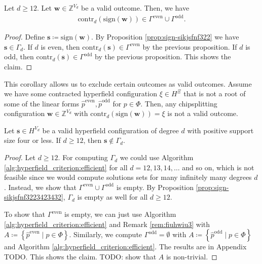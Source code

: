 \begin{corollary}\label{cor:validwunfwufneuiw}
    Let \( d \geq 12 \). Let \( \mathbf{w} \in \mathbb{Z}^{V_d} \) be a valid outcome. Then, we have 
    \begin{align*}
        \mathrm{contr}_d(\mathrm{sign}(\mathbf{w})) \in \Gamma^{\mathrm{even}} \cup \Gamma^{\mathrm{odd}}.
    \end{align*}
\end{corollary}

\begin{proof}
    Define \( \mathbf{s} \coloneqq \mathrm{sign}(\mathbf{w}) \). By Proposition \ref{prop:sign-sikjsfnf322} we have \( \mathbf{s} \in \Gamma_d \). If \( d \) is even, then \( \mathrm{contr}_d(\mathbf{s}) \in \Gamma^{\mathrm{even}} \) by the previous proposition. If \( d \) is odd, then \( \mathrm{contr}_d(\mathbf{s}) \in \Gamma^{\mathrm{odd}} \) by the previous proposition. This shows the claim.
\end{proof}

This corollary allows us to exclude certain outcomes as valid outcomes. Assume we have some contracted hyperfield configuration \( \xi \in H^{\Xi} \) that is not a root of some of the linear forms \( \hat p^{\mathrm{even}}, \hat p^{\mathrm{odd}} \) for \( p \in \Phi \). Then, any chipsplitting configuration \( \mathbf{w} \in \mathbb{Z}^{V_d} \) with \( \mathrm{contr}_d( \mathrm{sign}(\mathbf{w})) = \xi \) is not a valid outcome.


\begin{proposition}
    Let \( \mathbf{s} \in H^{V_d} \) be a valid hyperfield configuration of degree \( d \) with positive support size four or less. If \( d\geq 12 \), then \( \mathbf{s} \notin \Gamma_d \).

\end{proposition}

\begin{proof}
    Let \( d \geq 12 \). For computing \( \Gamma_d \) we could use Algorithm \ref{alg:hyperfield_criterion:efficient} for all \( d = 12, 13, 14, \dots \) and so on, which is not feasible since we would compute solutions sets for many infinitely many degrees \( d \). Instead, we show that \( \Gamma^{\mathrm{even}} \cup \Gamma^{\mathrm{odd}} \) is empty. By Proposition \ref{prop:sign-sikjsfnf3223423432}, \( \Gamma_d \) is empty as well for all \( d\geq 12 \).

    To show that \(  \Gamma^{\mathrm{even}} \) is empty, we can just use Algorithm \ref{alg:hyperfield_criterion:efficient} and Remark \ref{rem:fiuhwiu3} with \(A \coloneqq \left\{ \hat p^{\mathrm{even}} \mid p \in \Phi \right\}\). Similarly, we compute \( \Gamma^{\mathrm{odd}} = \emptyset \) with \(A \coloneqq \left\{ \hat p^{\mathrm{odd}} \mid p \in \Phi \right\}\) and Algorithm \ref{alg:hyperfield_criterion:efficient}. The results are in Appendix TODO. This shows the claim. TODO: show that \( A \) is non-trivial.
\end{proof}

